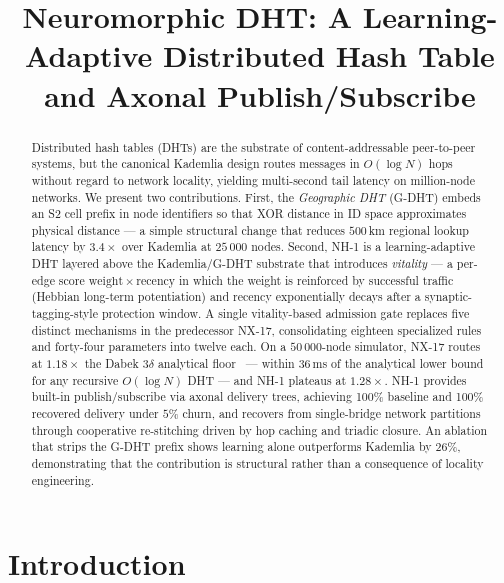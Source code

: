 \documentclass[conference]{IEEEtran}
\title{Neuromorphic DHT: A Learning-Adaptive Distributed Hash Table\\and Axonal Publish/Subscribe}
\author{
\IEEEauthorblockN{David A. Smith}
\IEEEauthorblockA{YZ.social\\
\texttt{davidasmith@gmail.com}}
}
\newcommand{\nhone}{NH-1\xspace}
\newcommand{\GDHT}{G-DHT\xspace}
\newcommand{\NXseventeen}{NX-17\xspace}
\begin{document}
\maketitle

\begin{abstract}
Distributed hash tables (DHTs) are the substrate of content-addressable
peer-to-peer systems, but the canonical Kademlia design routes messages in
$O(\log N)$ hops without regard to network locality, yielding multi-second
tail latency on million-node networks. We present two contributions.
First, the \emph{Geographic DHT} (\GDHT) embeds an S2 cell prefix in
node identifiers so that XOR distance in ID space approximates physical
distance --- a simple structural change that reduces $500$\,km regional
lookup latency by $3.4\times$ over Kademlia at $25\,000$ nodes. Second,
\nhone is a learning-adaptive DHT layered above the Kademlia/\GDHT
substrate that introduces \emph{vitality} --- a per-edge score
$\mathrm{weight} \times \mathrm{recency}$ in which the weight is
reinforced by successful traffic (Hebbian long-term potentiation) and
recency exponentially decays after a synaptic-tagging-style protection
window. A single vitality-based admission gate replaces five distinct
mechanisms in the predecessor \NXseventeen, consolidating eighteen
specialized rules and forty-four parameters into twelve each. On a
$50\,000$-node simulator, \NXseventeen routes at $1.18\times$ the Dabek
$3\delta$ analytical floor~\cite{dabek2004designing} --- within $36$\,ms
of the analytical lower bound for any recursive $O(\log N)$ DHT --- and
\nhone plateaus at $1.28\times$. \nhone provides built-in publish/subscribe
via axonal delivery trees, achieving 100\% baseline and 100\% recovered
delivery under $5\%$ churn, and recovers from single-bridge network
partitions through cooperative re-stitching driven by hop caching and
triadic closure. An ablation that strips the \GDHT prefix shows learning
alone outperforms Kademlia by $26\%$, demonstrating that the
contribution is structural rather than a consequence of locality
engineering.
\end{abstract}

\section{Introduction}
\label{sec:intro}
\end{document}
